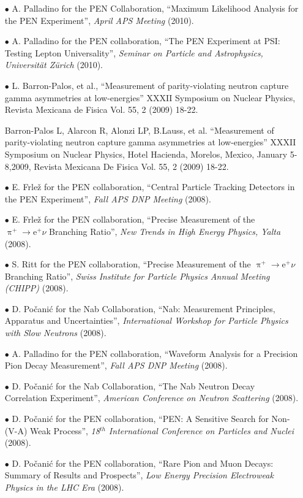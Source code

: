 \documentclass{article}[10pt]
\begin{document}
\begin{itemize}
\item [$\bullet$] A. Palladino for the PEN Collaboration, ``Maximum Likelihood Analysis for the PEN Experiment'', \emph{April APS Meeting} (2010).

\item [$\bullet$] A. Palladino for the PEN collaboration, ``The PEN Experiment at PSI: Testing Lepton Universality'', \emph{Seminar on Particle and Astrophysics, Universit\"at Z\"urich} (2010).

\item [$\bullet$] L. Barron-Palos, et al., ``Measurement of parity-violating neutron capture gamma asymmetries at low-energies'' XXXII Symposium on Nuclear Physics, Revista Mexicana de Fisica Vol. 55, 2 (2009) 18-22.

Barron-Palos L, Alarcon R, Alonzi LP, B.Lauss, et al. ``Measurement of parity-violating neutron capture gamma asymmetries at low-energies'' XXXII Symposium on Nuclear Physics, Hotel Hacienda, Morelos, Mexico, January 5-8,2009, Revista Mexicana De Fisica Vol. 55, 2 (2009) 18-22.


\item [$\bullet$] E. Frle\v{z} for the PEN collaboration, ``Central Particle Tracking Detectors in the PEN Experiment'', \emph{Fall APS DNP Meeting} (2008).

\item [$\bullet$] E. Frle\v{z} for the PEN collaboration, ``Precise Measurement of the $\uppi^{+}\rightarrow\mathrm{e}^{+}\nu$ Branching Ratio'', \emph{New Trends in High Energy Physics, Yalta} (2008).

\item [$\bullet$] S. Ritt for the PEN collaboration, ``Precise Measurement of the $\uppi^{+}\rightarrow\mathrm{e}^{+}\nu$ Branching Ratio'', \emph{Swiss Institute for Particle Physics Annual Meeting (CHIPP)} (2008).

\item [$\bullet$] D. Po\v{c}ani\'c for the Nab Collaboration,  ``Nab: Measurement Principles, Apparatus and Uncertainties'',  \emph{International Workshop for Particle Physics with Slow Neutrons} (2008).

\item [$\bullet$] A. Palladino for the PEN collaboration, ``Waveform Analysis for a Precision Pion Decay Measurement'', \emph{Fall APS DNP Meeting} (2008).

\item [$\bullet$] D. Po\v{c}ani\'c for the Nab Collaboration, ``The Nab Neutron Decay Correlation Experiment'', \emph{American Conference on Neutron Scattering} (2008).

\item [$\bullet$] D. Po\v{c}ani\'c for the PEN collaboration, ``PEN: A Sensitive Search for Non-(V-A) Weak Process'', \emph{18$^{th}$ International Conference on Particles and Nuclei} (2008).

\item [$\bullet$] D. Po\v{c}ani\'c for the PEN collaboration, ``Rare Pion and Muon Decays: Summary of Results and Prospects'', \emph{Low Energy Precision Electroweak Physics in the LHC Era} (2008).
\end{itemize}
\end{document}
